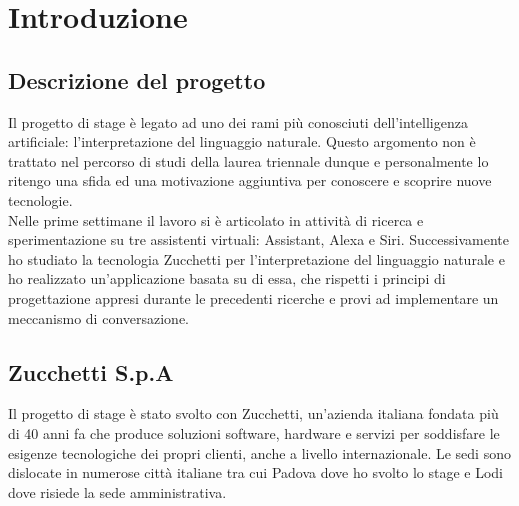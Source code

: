 
\chapter{Introduzione}
\label{cap:introduzione}





\section{Descrizione del progetto}
Il progetto di stage è legato ad uno dei rami più conosciuti dell'intelligenza artificiale: l'interpretazione del linguaggio naturale. Questo argomento non è trattato nel percorso di studi della laurea triennale dunque e personalmente lo ritengo una sfida ed una motivazione aggiuntiva per conoscere e scoprire nuove tecnologie. \\
Nelle prime settimane il lavoro si è articolato in attività di ricerca e sperimentazione su tre assistenti virtuali: Assistant, Alexa e Siri. Successivamente ho studiato la tecnologia Zucchetti per l'interpretazione del linguaggio naturale e ho realizzato un'applicazione basata su di essa, che rispetti i principi di progettazione appresi durante le precedenti ricerche e provi ad implementare un meccanismo di conversazione.
\section{Zucchetti S.p.A}
Il progetto di stage è stato svolto con Zucchetti, un'azienda italiana fondata più di 40 anni fa che produce soluzioni software, hardware e servizi per soddisfare le esigenze tecnologiche dei propri clienti, anche a livello internazionale. Le sedi sono dislocate in numerose città italiane tra cui Padova dove ho svolto lo stage e Lodi dove risiede la sede amministrativa.

